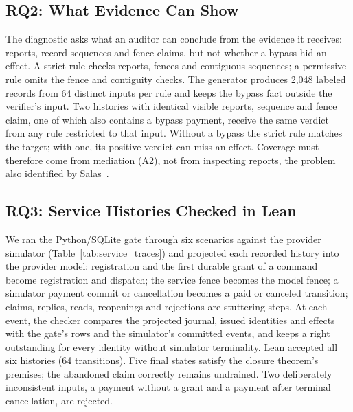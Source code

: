 \documentclass[runningheads]{llncs}
\begin{document}
\subsection{RQ2: What Evidence Can Show}
\label{sec:diagnostic}
The diagnostic asks what an auditor can conclude from the evidence it receives:
reports, record sequences and fence claims, but not whether a bypass hid an
effect. A strict rule checks reports, fences and contiguous sequences; a
permissive rule omits the fence and contiguity checks. The generator produces
2,048 labeled records from 64 distinct inputs per rule and keeps the bypass fact
outside the verifier's input. Two histories with identical visible reports,
sequence and fence claim, one of which also contains a bypass payment, receive
the same verdict from any rule restricted to that input. Without a bypass the
strict rule matches the target; with one, its positive verdict can miss an
effect. Coverage must therefore come from mediation (A2), not from inspecting
reports, the problem also identified by Salas~\cite{salas}.

\subsection{RQ3: Service Histories Checked in Lean}
\label{sec:traces}
We ran the Python/SQLite gate through six scenarios against the provider
simulator (Table~\ref{tab:service_traces}) and projected each recorded history
into the provider model: registration and the first durable grant of a command
become registration and dispatch; the service fence becomes the model fence; a
simulator payment commit or cancellation becomes a paid or canceled transition;
claims, replies, reads, reopenings and rejections are stuttering steps. At each
event, the checker compares the projected journal, issued identities and
effects with the gate's rows and the simulator's committed events, and keeps a
right outstanding for every identity without simulator terminality. Lean
accepted all six histories (64 transitions). Five final states satisfy the
closure theorem's premises; the abandoned claim correctly remains undrained.
Two deliberately inconsistent inputs, a payment without a grant and a payment
after terminal cancellation, are rejected.
\end{document}
